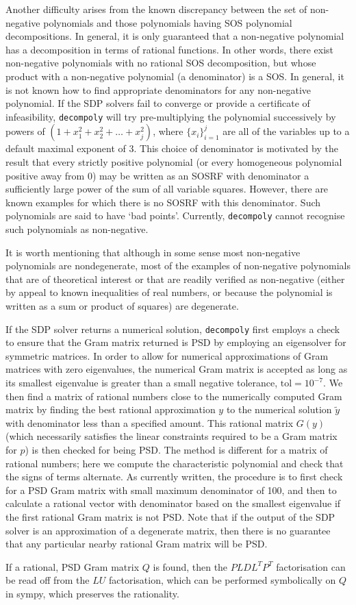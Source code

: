\documentclass[oneside, 10pt]{amsart}
\begin{document}
    Another difficulty arises from the known discrepancy between the set of non-negative polynomials and those polynomials having SOS polynomial decompositions. In general, it is only guaranteed that a non-negative polynomial has a decomposition in terms of rational functions. In other words, there exist non-negative polynomials with no rational SOS decomposition, but whose product with a non-negative polynomial (a denominator) is a SOS. In general, it is not known how to find appropriate denominators for any non-negative polynomial. If the SDP solvers fail to converge or provide a certificate of infeasibility,  \texttt{decompoly} will try pre-multiplying the polynomial successively by powers of $(1 + x_1^2 + x_2^2+\dots+x_j^2)$, where $\{x_i\}_{i=1}^j$ are all of the variables
    up to a default maximal exponent of $3$. This choice of denominator is motivated by the result that every strictly positive polynomial (or every homogeneous polynomial positive away from $0$) may be written as an SOSRF with denominator a sufficiently large power of the sum of all variable squares. However, there are known examples for which there is no SOSRF with this denominator. Such polynomials are said to have `bad points'. Currently, \texttt{decompoly} cannot recognise such polynomials as non-negative.

    It is worth mentioning that although in some sense most non-negative polynomials are nondegenerate, most of the examples of non-negative polynomials that are of theoretical interest or that are readily verified as non-negative (either by appeal to known inequalities of real numbers, or because the polynomial is written as a sum or product of squares) are degenerate.

    If the SDP solver returns a numerical solution, \texttt{decompoly} first employs a check to ensure that the Gram matrix returned is PSD by employing an eigensolver for symmetric matrices. In order to allow for numerical approximations of Gram matrices with zero eigenvalues, the numerical Gram matrix is accepted as long as its smallest eigenvalue is greater than a small negative tolerance, $\mathrm{tol} = 10^{-7}$. We then find a matrix of rational numbers close to the numerically computed Gram matrix by finding the best rational approximation $y$ to the numerical solution $\tilde{y}$ with denominator less than a specified amount. This rational matrix $G(y)$ (which necessarily satisfies the linear constraints required to be a Gram matrix for $p$) is then checked for being PSD. The method is different for a matrix of rational numbers; here we compute the characteristic polynomial and check that the signs of terms alternate. As currently written, the procedure is to first check for a PSD Gram matrix with small maximum denominator of 100, and then to calculate a rational vector with denominator based on the smallest eigenvalue if the first rational Gram matrix is not PSD. Note that if the output of the SDP solver is an approximation of a degenerate matrix, then there is no guarantee that any particular nearby rational Gram matrix will be PSD.

    If a rational, PSD Gram matrix $Q$ is found, then the $PLDL^T P^T$ factorisation can be read off from the $LU$ factorisation, which can be performed symbolically on $Q$ in sympy, which preserves the rationality.
\end{document}
